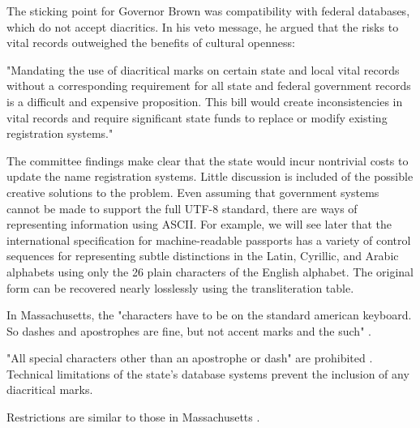 The sticking point for Governor Brown was compatibility with federal databases,
which do not accept diacritics. In his veto message, he argued that the risks to
vital records outweighed the benefits of cultural openness:

"Mandating the use of diacritical marks on certain state and local vital records
without a corresponding requirement for all state and federal government records
is a difficult and expensive proposition. This bill would create inconsistencies
in vital records and require significant state funds to replace or modify
existing registration systems."

The committee findings make clear that the state would incur nontrivial costs to
update the name registration systems. Little discussion is included of the
possible creative solutions to the problem. Even assuming that government
systems cannot be made to support the full UTF-8 standard, there are ways of
representing information using ASCII. For example, we will see later that the
international specification for machine-readable passports has a variety of
control sequences for representing subtle distinctions in the Latin, Cyrillic,
and Arabic alphabets using only the 26 plain characters of the English alphabet.
The original form can be recovered nearly losslessly using the transliteration
table.

In Massachusetts, the "characters have to be on the standard american keyboard.
So dashes and apostrophes are fine, but not accent marks and the such"
\parencite{larson11}.

"All special characters other than an apostrophe or dash" are prohibited
\parencite{larson11}. Technical limitations of the state's database systems
prevent the inclusion of any diacritical marks.

Restrictions are similar to those in Massachusetts \parencite{larson11}.
